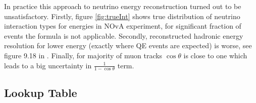 In practice this approach to neutrino energy reconstruction turned out to be unsatisfactory.
Firstly, figure \ref{fig:trueInt} shows true distribution of neutrino interaction types for
energies in NOvA experiment, for significant fraction of events the formula is not applicable. 
Secondly, reconstructed hadronic energy resolution for lower energy (exactly where QE
events are expected) is worse, see figure 9.18 in \cite{Susan}. Finally, for majority
of muon tracks $\cos\theta$ is close to one which leads to a big uncertainty in 
$\frac{1}{1-\cos\theta}$ term.

\subsection{Lookup Table}
